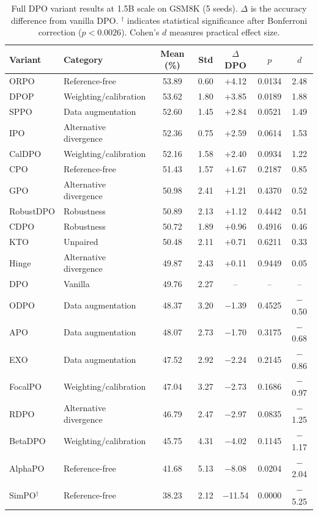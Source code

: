 \documentclass{article}
\begin{document}
\begin{table}[ht]
\centering
\caption{Full DPO variant results at 1.5B scale on GSM8K (5 seeds). $\Delta$ is the accuracy difference from vanilla DPO. $^\dagger$ indicates statistical significance after Bonferroni correction ($p < 0.0026$). Cohen's $d$ measures practical effect size.}
\label{tab:dpo_variant_full}
\small
\begin{tabular}{@{}llccccc@{}}
\toprule
\textbf{Variant} & \textbf{Category} & \textbf{Mean (\%)} & \textbf{Std} & \textbf{$\Delta$ DPO} & \textbf{$p$} & \textbf{$d$} \\
\midrule
ORPO & Reference-free & 53.89 & 0.60 & +4.12 & 0.0134 & 2.48 \\
DPOP & Weighting/calibration & 53.62 & 1.80 & +3.85 & 0.0189 & 1.88 \\
SPPO & Data augmentation & 52.60 & 1.45 & +2.84 & 0.0521 & 1.49 \\
IPO & Alternative divergence & 52.36 & 0.75 & +2.59 & 0.0614 & 1.53 \\
CalDPO & Weighting/calibration & 52.16 & 1.58 & +2.40 & 0.0934 & 1.22 \\
CPO & Reference-free & 51.43 & 1.57 & +1.67 & 0.2187 & 0.85 \\
GPO & Alternative divergence & 50.98 & 2.41 & +1.21 & 0.4370 & 0.52 \\
RobustDPO & Robustness & 50.89 & 2.13 & +1.12 & 0.4442 & 0.51 \\
CDPO & Robustness & 50.72 & 1.89 & +0.96 & 0.4916 & 0.46 \\
KTO & Unpaired & 50.48 & 2.11 & +0.71 & 0.6211 & 0.33 \\
Hinge & Alternative divergence & 49.87 & 2.43 & +0.11 & 0.9449 & 0.05 \\
DPO & Vanilla & 49.76 & 2.27 & -- & -- & -- \\
ODPO & Data augmentation & 48.37 & 3.20 & $-$1.39 & 0.4525 & $-$0.50 \\
APO & Data augmentation & 48.07 & 2.73 & $-$1.70 & 0.3175 & $-$0.68 \\
EXO & Data augmentation & 47.52 & 2.92 & $-$2.24 & 0.2145 & $-$0.86 \\
FocalPO & Weighting/calibration & 47.04 & 3.27 & $-$2.73 & 0.1686 & $-$0.97 \\
RDPO & Alternative divergence & 46.79 & 2.47 & $-$2.97 & 0.0835 & $-$1.25 \\
BetaDPO & Weighting/calibration & 45.75 & 4.31 & $-$4.02 & 0.1145 & $-$1.17 \\
AlphaPO & Reference-free & 41.68 & 5.13 & $-$8.08 & 0.0204 & $-$2.04 \\
SimPO$^\dagger$ & Reference-free & 38.23 & 2.12 & $-$11.54 & 0.0000 & $-$5.25 \\
\bottomrule
\end{tabular}
\end{table}
\end{document}
